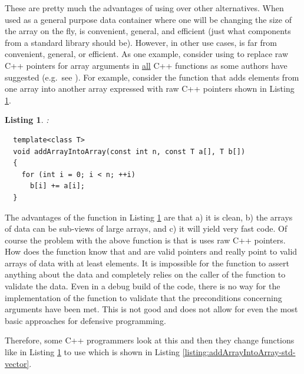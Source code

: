 \documentclass[pdf,ps2pdf,11pt]{SANDreport}
\newtheorem{listing}{Listing}
\begin{document}
These are pretty much the advantages of using {} over
other alternatives.  When used as a general purpose data container
where one will be changing the size of the array on the fly,
{} is convenient, general, and efficient (just what
components from a standard library should be).  However, in other use
cases, {} is far from convenient, general, or
efficient.  As one example, consider using {} to
replace raw C++ pointers for array arguments in {}\underline{all} C++
functions as some authors have suggested (e.g.\ see
{}\cite{Modernizing-the-C++-Interface-to-MPI}).  For example, consider
the function that adds elements from one array into another array
expressed with raw C++ pointers shown in Listing
{}\ref{listing:addArrayIntoArray-raw}.

\begin{listing}:\\
\label{listing:addArrayIntoArray-raw}
{\small\begin{verbatim}
  template<class T>
  void addArrayIntoArray(const int n, const T a[], T b[])
  {
    for (int i = 0; i < n; ++i)
      b[i] += a[i];
  }
\end{verbatim}}
\end{listing}

The advantages of the function in Listing
{}\ref{listing:addArrayIntoArray-raw} are that a) it is clean, b) the
arrays of data can be sub-views of large arrays, and c) it will yield
very fast code.  Of course the problem with the above function
{} is that is uses raw C++ pointers.  How
does the function {} know that
{} and {} are valid pointers and really point to
valid arrays of data with at least {} elements.  It is
impossible for the function {} to
assert anything about the data and completely relies on the caller of
the function to validate the data.  Even in a debug build of the code,
there is no way for the implementation of the function
{} to validate that the preconditions
concerning arguments have been met.  This is not good and does not
allow for even the most basic approaches for defensive programming.

Therefore, some C++ programmers look at this and then they change
functions like {} in Listing
{}\ref{listing:addArrayIntoArray-raw} to use {}
which is shown in Listing
{}\ref{listing:addArrayIntoArray-std-vector}.
\end{document}
